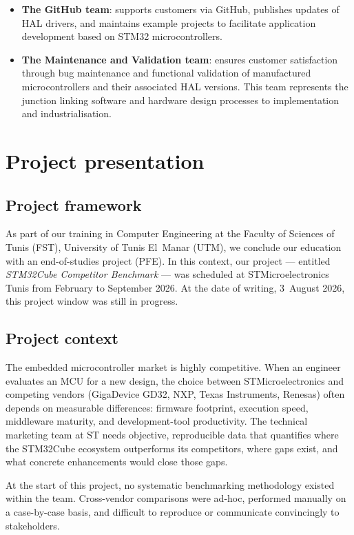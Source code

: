 \begin{itemize}
\item \textbf{The GitHub team}: supports customers via GitHub, publishes updates of HAL
drivers, and maintains example projects to facilitate application development based on
STM32 microcontrollers.
\item \textbf{The Maintenance and Validation team}: ensures customer satisfaction through
bug maintenance and functional validation of manufactured microcontrollers and their
associated HAL versions. This team represents the junction linking software and hardware
design processes to implementation and industrialisation.
\end{itemize}

\section{Project presentation}
\label{sec:project-presentation}

\subsection{Project framework}

As part of our training in Computer Engineering at the Faculty of Sciences of Tunis (FST),
University of Tunis El~Manar (UTM), we conclude our education with an end-of-studies
project (PFE). In this context, our project --- entitled \emph{STM32Cube Competitor
Benchmark} --- was scheduled at STMicroelectronics Tunis from February to September 2026.
At the date of writing, 3~August 2026, this project window was still in progress.

\subsection{Project context}
\label{sec:project-context}

The embedded microcontroller market is highly competitive. When an engineer evaluates an MCU
for a new design, the choice between STMicroelectronics and competing vendors (GigaDevice
GD32, NXP, Texas Instruments, Renesas) often depends on measurable differences: firmware
footprint, execution speed, middleware maturity, and development-tool productivity. The
technical marketing team at ST needs objective, reproducible data that quantifies where the
STM32Cube ecosystem outperforms its competitors, where gaps exist, and what concrete
enhancements would close those gaps.

At the start of this project, no systematic benchmarking methodology existed within the
team. Cross-vendor comparisons were ad-hoc, performed manually on a case-by-case basis,
and difficult to reproduce or communicate convincingly to stakeholders.

